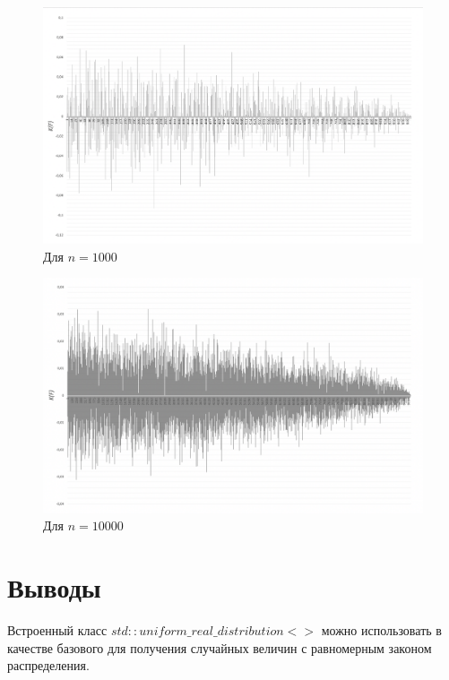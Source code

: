 \documentclass{article}
\begin{document}
\begin{enumerate}
				\begin{figure}[!htb]
					\includegraphics[scale=0.4]{3.png}
					\caption{Для $n = 1000$}
				\end{figure}
				
				\begin{figure}[!htb]
					\includegraphics[scale=0.4]{4.png}
					\caption{Для $n = 10000$}
				\end{figure}		
		\end{enumerate}
	\FloatBarrier
	
	\clearpage
	\newpage
		
	\section{Выводы}
	Встроенный класс $std::uniform\_real\_distribution<>$ можно использовать в качестве базового для получения случайных величин с равномерным законом распределения.
	
	
	
	
	
	
	
	
	
	
		
\end{document}
